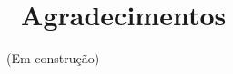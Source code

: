 \chapter*{\hspace*{3pt}~Agradecimentos}

\begingroup
\small

(Em construção)

\endgroup




\newpage
